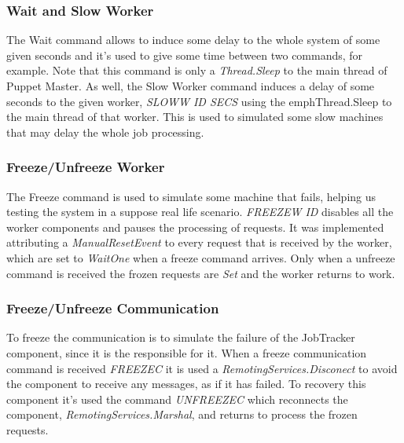 \documentclass[times, 10pt,twocolumn]{article}
\begin{document}
            \subsubsection{Wait and Slow Worker}
            The Wait command allows to induce some delay to the whole system of some given seconds and it's used to give some time between two commands, for example.
            Note that this command is only a \emph{Thread.Sleep} to the main thread of Puppet Master.
           As well, the Slow Worker command induces a delay of some seconds to the given worker,
            \emph{SLOWW ID SECS} using the emph{Thread.Sleep} to the main thread of that worker. This is used to simulated some slow machines that may delay the whole job processing.

            \subsubsection{Freeze/Unfreeze Worker} \label{freeze}
            The Freeze command is used to simulate some machine that fails, helping us testing the system in a suppose real life scenario. \emph{FREEZEW ID}
            disables all the worker components and pauses the processing of requests. It was implemented attributing a \emph{ManualResetEvent}
            to every request that is received by the worker, which are set to \emph{WaitOne} when a freeze command arrives.
            Only when a unfreeze command is received the frozen requests are \emph{Set} and the worker returns to work.

          \subsubsection{Freeze/Unfreeze Communication}
          To freeze the communication is to simulate the failure of the JobTracker component, since it is the responsible for it.
          When a freeze communication command is received \emph{FREEZEC} it is used a \emph{RemotingServices.Disconect}
          to avoid the component to receive any messages, as if it has failed.
	        To recovery this component it's used the command \emph{UNFREEZEC} which reconnects the component, \emph{RemotingServices.Marshal},
          and returns to process the frozen requests.
\end{document}

